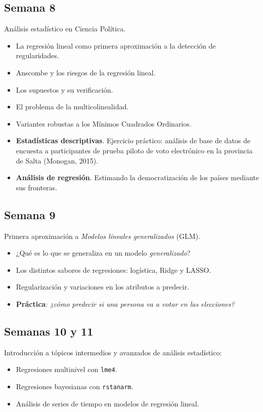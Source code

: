 \documentclass[11pt]{article}
\begin{document}
\subsection*{Semana 8}
 Análisis estadístico en Ciencia Política. 
    \begin{itemize}
            \item La regresión lineal como primera aproximación a la detección de regularidades.
            \item Anscombe y los riesgos de la regresión lineal.
            \item Los supuestos y su verificación.
            \item El problema de la multicolinealidad.
            \item Variantes robustas a los Mínimos Cuadrados Ordinarios.
            \item \textbf{Estadísticas descriptivas}. Ejercicio práctico: análisis de base de datos de encuesta a participantes de prueba piloto de voto electrónico en la provincia de Salta (Monogan, 2015).
            \item \textbf{Análisis de regresión}. Estimando la democratización de los países mediante sus fronteras. 
    \end{itemize}

\subsection*{Semana 9}
Primera aproximación a \textit{Modelos lineales generalizados} (GLM). 
        
    \begin{itemize}
        \item ¿Qué es lo que se generaliza en un modelo \textit{generalizado}?
        \item Los distintos sabores de regresiones: logística, Ridge y LASSO.
        \item Regularización y variaciones en los atributos a predecir.
        \item  \textbf{Práctica}: \textit{¿cómo predecir si una persona va a votar en las elecciones?}
    \end{itemize}     
    
\subsection*{Semanas 10 y 11}

Introducción a tópicos intermedios y avanzados de análisis estadístico:
    \begin{itemize}
        \item Regresiones multinivel con \verb=lme4=.
        \item Regresiones bayesianas con \verb=rstanarm=.
        \item Análisis de series de tiempo en modelos de regresión lineal.
    \end{itemize}
\end{document}
